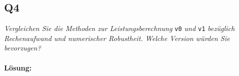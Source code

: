 \documentclass[a4,paper,fleqn]{article}
\begin{document}
\subsection{Q4}
\label{q4}
\emph{Vergleichen Sie die Methoden zur Leistungsberechnung}
\verb?v0?
\emph{und}
\verb?v1?
\emph{bezüglich Rechenaufwand und numerischer Robustheit. Welche Version 
würden Sie bevorzugen?}
\paragraph{Lösung: }
\end{document}

